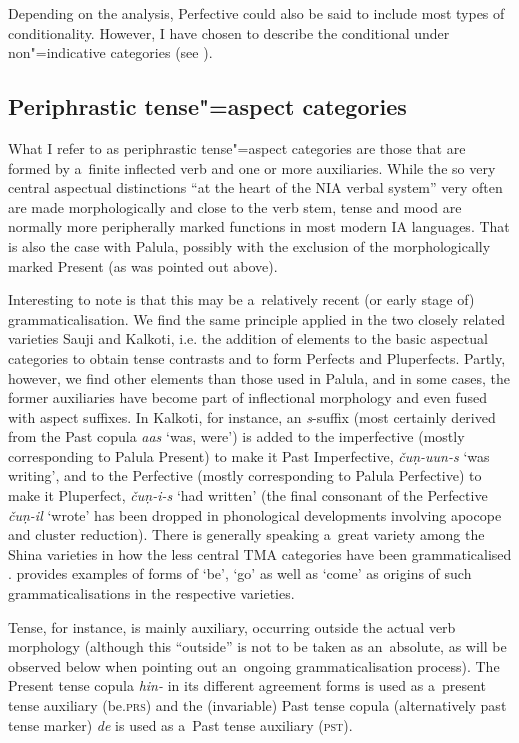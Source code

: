 Depending on the analysis, Perfective could also be said to include most types of conditionality. However, I have chosen to describe the conditional under non"=indicative categories (see ).


\subsection{Periphrastic tense"=aspect categories}
\label{subsec:9-1-5}

What I refer to as periphrastic tense"=aspect categories are those that are formed by a~finite inflected verb and one or more auxiliaries. While the so very central aspectual distinctions ``at the heart of the NIA verbal system'' \citep[262]{masica1991} very often are made morphologically and close to the verb stem, tense and mood are normally more peripherally marked functions in most modern IA languages. That is also the case with Palula, possibly with the exclusion of the morphologically marked Present (as was pointed out above). 



Interesting to note is that this may be a~relatively recent (or early stage of) grammaticalisation. We find the same principle applied in the two closely related varieties Sauji and Kalkoti, i.e. the addition of elements to the basic aspectual categories to obtain tense contrasts and to form Perfects and Pluperfects. Partly, however, we find other elements than those used in Palula, and in some cases, the former auxiliaries have become part of inflectional morphology and even fused with aspect suffixes. In Kalkoti, for instance, an \textit{s}-suffix (most certainly derived from the Past copula \textit{aas} `was, were') is added to the imperfective (mostly corresponding to Palula Present) to make it Past Imperfective, \textit{čuṇ-uun-s} `was writing', and to the Perfective (mostly corresponding to Palula Perfective) to make it Pluperfect, \textit{čuṇ-i-s} `had written' (the final consonant of the Perfective \textit{čuṇ-il} `wrote' has been dropped in phonological developments involving apocope and cluster reduction). There is generally speaking a~great variety among the Shina varieties in how the less central TMA categories have been grammaticalised \citep[144--156]{liljegren2013}. \citet[38]{schmidt2004} provides examples of forms of `be', `go' as well as `come' as origins of such grammaticalisations in the respective varieties. 



Tense, for instance, is mainly auxiliary, occurring outside the actual verb morphology (although this ``outside'' is not to be taken as an~absolute, as will be observed below when pointing out an~ongoing grammaticalisation process). The Present tense copula \textit{hin-} in its different agreement forms is used as a~present tense auxiliary (be.\textsc{prs}) and the (invariable) Past tense copula (alternatively past tense marker) \textit{de} is used as a~Past tense auxiliary (\textsc{pst}).



